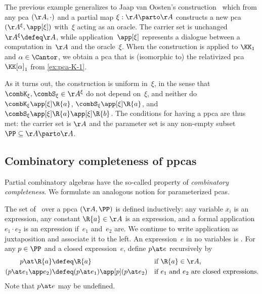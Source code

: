 \begin{example}
  \label{ex:general-oracle-ppca}%
  The previous example generalizes to Jaap van Oosten's construction~\cite[Thm~1.7.5]{oosten08:_realiz} which from any pca $(\AA, {\cdot})$ and a partial map $\xi : \AA \parto \AA$ constructs a new pca $(\AA^\xi, {\app[\xi]})$ with~$\xi$ acting as an oracle.
  The carrier set is unchanged $\AA^\xi \defeq \AA$, while application~$\app[\xi]$ represents a dialogue between a computation in~$\AA$ and the oracle~$\xi$.
  When the construction is applied to $\KK_1$ and $\alpha \in \Cantor$, we obtain a pca that is (isomorphic to)
  the relativized pca $\KK[\alpha]_1$ from \cref{ex:pca-K-1}.

  As it turns out, the construction is uniform in~$\xi$, in the sense that $\combK_\xi, \combS_\xi \in \AA^\xi$ do not depend on~$\xi$, and neither do $\combK_\xi \app[\xi] \R{a}$, $\combS_\xi \app[\xi] \R{a}$, and $\combS_\xi \app[\xi] \R{a} \app[\xi] \R{b}$.
  The conditions for having a ppca are thus met: the carrier set is $\AA$ and the parameter set is any non-empty
  subset $\PP \subseteq \AA \parto \AA$.
\end{example}



\subsection{Combinatory completeness of ppcas}
\label{sec:comb-compl-ppcas}

Partial combinatory algebras have the so-called property of \emph{combinatory completeness}.
We formulate an analogous notion for parameterized pcas.

The set of~ over a ppca $(\AA, \PP)$ is defined inductively:
any variable $x_i$ is an expression, any constant $\R{a} \in \AA$ is an expression, and a formal application $e_1 \cdot e_2$ is an expression if~$e_1$ and~$e_2$ are.
%
We continue to write application as juxtaposition and associate it to the left.
%
An expression~$e$ in no variables is . For any $p \in \PP$ and a closed expression~$e$,
define $p \at e$ recursively by
%
\begin{align*}
  p \at \R{a} &\defeq \R{a} &&\text{if $\R{a} \in \AA$,}
  \\
  (p \at e_1 \app e_2) &\defeq (p \at e_1) \app[p] (p \at e_2)
  &&\text{if $e_1$ and $e_2$ are closed expressions.}
\end{align*}
%
Note that $p \at e$ may be undefined.

